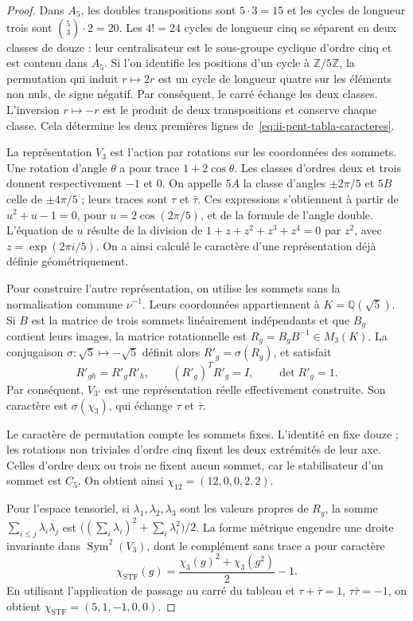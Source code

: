 \begin{proof}
Dans \(A_5\), les doubles transpositions sont \(5\cdot3=15\) et
les cycles de longueur trois sont \(\binom53\cdot2=20\).
Les \(4!=24\) cycles de longueur cinq se séparent en deux classes de
douze : leur centralisateur est le sous-groupe cyclique d’ordre cinq et est
contenu dans \(A_5\). Si l’on identifie les positions d’un cycle
à \(\mathbb Z/5\mathbb Z\), la permutation qui induit
\(r\mapsto2r\) est un cycle de longueur quatre sur les éléments
non nuls, de signe négatif. Par conséquent, le carré échange les deux
classes. L’inversion \(r\mapsto-r\) est le produit de deux
transpositions et conserve chaque classe. Cela détermine les deux premières
lignes de~\eqref{eq:ii-pent-tabla-caracteres}.

La représentation \(V_3\) est l’action par rotations sur les
coordonnées des sommets. Une rotation d’angle \(\theta\)
a pour trace \(1+2\cos\theta\). Les classes d’ordres deux et trois
donnent respectivement \(-1\) et \(0\). On appelle \(5A\) la
classe d’angles \(\pm2\pi/5\) et \(5B\) celle de
\(\pm4\pi/5\) ; leurs traces sont \(\tau\) et \(\bar\tau\).
Ces expressions s’obtiennent à partir de
\(u^2+u-1=0\), pour \(u=2\cos(2\pi/5)\), et de la formule
de l’angle double. L’équation de \(u\) résulte de la division de
\(1+z+z^2+z^3+z^4=0\) par \(z^2\), avec
\(z=\exp(2\pi i/5)\). On a ainsi calculé le caractère d’une
représentation déjà définie géométriquement.

Pour construire l’autre représentation, on utilise les sommets sans la
normalisation commune \(\nu^{-1}\). Leurs coordonnées appartiennent à
\(K=\mathbb Q(\sqrt5)\). Si \(B\) est la matrice de trois sommets
linéairement indépendants et que \(B_g\) contient leurs images, la
matrice rotationnelle est \(R_g=B_gB^{-1}\in M_3(K)\).
La conjugaison \(\sigma:\sqrt5\mapsto-\sqrt5\) définit alors
\(R'_g=\sigma(R_g)\), et satisfait
\[
 R'_{gh}=R'_gR'_h,\qquad
 (R'_g)^TR'_g=I,\qquad \det R'_g=1.
\]
Par conséquent, \(V_{3'}\) est une représentation réelle effectivement
construite. Son caractère est \(\sigma(\chi_3)\), qui échange
\(\tau\) et \(\bar\tau\).

Le caractère de permutation compte les sommets fixes. L’identité en fixe
douze ; les rotations non triviales d’ordre cinq fixent les deux extrémités
de leur axe. Celles d’ordre deux ou trois ne fixent aucun sommet, car le
stabilisateur d’un sommet est \(C_5\). On obtient ainsi
\(\chi_{12}=(12,0,0,2,2)\).

Pour l’espace tensoriel, si \(\lambda_1,\lambda_2,\lambda_3\)
sont les valeurs propres de \(R_g\), la somme
\(\sum_{i\leq j}\lambda_i\lambda_j\) est
\(\bigl((\sum_i\lambda_i)^2+\sum_i\lambda_i^2\bigr)/2\).
La forme métrique engendre une droite invariante dans
\(\operatorname{Sym}^2(V_3)\), dont le complément sans trace a
pour caractère
\begin{equation}
\label{eq:ii-pent-caracter-stf}
 \chi_{\mathrm{STF}}(g)
 =\frac{\chi_3(g)^2+\chi_3(g^2)}2-1.
\end{equation}
En utilisant l’application de passage au carré du tableau et
\(\tau+\bar\tau=1\), \(\tau\bar\tau=-1\), on obtient
\(\chi_{\mathrm{STF}}=(5,1,-1,0,0)\).


\end{proof}
